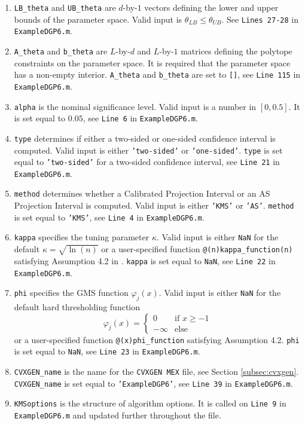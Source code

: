 \documentclass[12pt]{article}
\def\code#1{\texttt{#1}}
\begin{document}
\begin{enumerate}
\item \code{LB\_theta} and \code{UB\_theta} are $d$-by-$1$ vectors defining the lower and upper bounds of the parameter space.  Valid input is $\theta_{LB} \leq \theta_{UB}$. See \code{Lines 27-28} in \code{ExampleDGP6.m}.

\item  \code{A\_theta} and \code{b\_theta} are $L$-by-$d$ and $L$-by-$1$ matrices defining the polytope constraints on the parameter space.  It is required that the parameter space has a non-empty interior.  \code{A\_theta} and \code{b\_theta} are set to \code{[]}, see \code{Line 115} in \code{ExampleDGP6.m}.

\item \code{alpha} is the nominal significance level.  Valid input is a number in $[0,0.5]$.   It is set equal to $0.05$, see \code{Line 6} in \code{ExampleDGP6.m}.

\item \code{type} determines if either a two-sided or one-sided confidence interval is computed. Valid input is either \code{'two-sided'}  or  \code{'one-sided'}. \code{type} is set equal to \code{'two-sided'} for a two-sided confidence interval, see \code{Line 21} in \code{ExampleDGP6.m}.

 \item \code{method} determines whether a Calibrated Projection Interval or an AS Projection Interval is computed.  Valid input is either  \code{'KMS'}  or  \code{'AS'}.  \code{method} is set equal to \code{'KMS'}, see \code{Line 4} in \code{ExampleDGP6.m}.

 \item \code{kappa} specifies the tuning parameter $\kappa$.  Valid input is either  \code{NaN} for the default $\kappa = \sqrt{\ln(n)}$ or a user-specified function \code{@(n)kappa\_function(n)} satisfying  Assumption 4.2 in .   \code{kappa} is set equal to \code{NaN}, see \code{Line 22} in \code{ExampleDGP6.m}.

 \item \code{phi} specifies the GMS function $\varphi_j(x)$.  Valid input is either  \code{NaN} for the default hard thresholding function
     \[
     \varphi_j(x) = \begin{cases} 0 & \text{if } x \geq -1 \\ -\infty & \text{else} \end{cases}
      \]
      or a user-specified function \code{@(x)phi\_function} satisfying Assumption 4.2.   \code{phi} is set equal to \code{NaN}, see \code{Line 23} in \code{ExampleDGP6.m}.

\item \code{CVXGEN\_name} is the name for the \code{CVXGEN MEX} file, see Section \ref{subsec:cvxgen}.   \code{CVXGEN\_name}  is set equal to \code{'ExampleDGP6'}, see \code{Line 39} in \code{ExampleDGP6.m}.

\item \code{KMSoptions} is the structure of algorithm options.  It is called on \code{Line 9} in \code{ExampleDGP6.m} and updated further throughout the file.
\end{enumerate}
\end{document}
